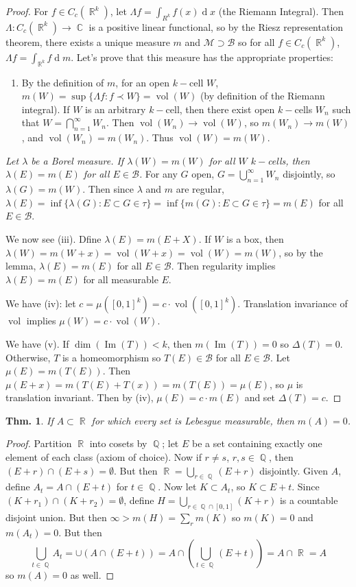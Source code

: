 \documentclass[12pt, a4paper]{book}
\DeclareMathOperator{\Q}{\mathbb{Q}}
\DeclareMathOperator{\R}{\mathbb{R}}
\DeclareMathOperator{\C}{\mathbb{C}}
\DeclareMathOperator{\im}{Im}
\DeclareMathOperator{\vol}{vol}
\renewcommand{\d}[1]{\ensuremath{\operatorname{d}\!{#1}}} %
\newtheorem{theorem}{Thm.}[section]
\theoremstyle{nonumberplain}
\newtheorem{proof}{Proof}
\begin{document}
\begin{proof}
    For $f\in C_c(\R^k)$, let $\Lambda f=\int_{R^k}f(x)\d{x}$ (the Riemann Integral).
    Then $\Lambda:C_c(\R^k)\to\C$ is a positive linear functional, so by the Riesz representation theorem, there exists a unique measure $m$ and $\mathcal{M}\supset\mathcal{B}$ so for all $f\in C_c(\R^k)$, $\Lambda f=\int_{\R^k}f\d{m}$.
    Let's prove that this measure has the appropriate properties:
    \begin{enumerate}[nolistsep]
        \item By the definition of $m$, for an open $k-$cell $W$, $m(W)=\sup\{\Lambda f:f\prec W\}=\vol(W)$ (by definition of the Riemann integral).
            If $W$ is an arbitrary $k-$cell, then there exist open $k-$cells $W_n$ such that $W=\bigcap\limits_{n=1}^\infty W_n$.
            Then $\vol(W_n)\to\vol(W)$, so $m(W_n)\to m(W)$, and $\vol(W_n)=m(W_n)$.
            Thus $\vol(W)=m(W)$.
    \end{enumerate}
    \textit{Let $\lambda$ be a Borel measure.
    If $\lambda(W)=m(W)$ for all $W$ $k-$cells, then $\lambda(E)=m(E)$ for all $E\in\mathcal{B}$.}
    For any $G$ open, $G=\bigcup\limits_{n=1}^\infty W_n$ disjointly, so $\lambda(G)=m(W)$.
    Then since $\lambda$ and $m$ are regular, $\lambda(E)=\inf\{\lambda(G):E\subset G\in\tau\}=\inf\{m(G):E\subset G\in\tau\}=m(E)$ for all $E\in\mathcal{B}$.

    We now see (iii).
    Dfine $\lambda(E)=m(E+X)$.
    If $W$ is a box, then $\lambda(W)=m(W+x)=\vol(W+x)=\vol(W)=m(W)$, so by the lemma, $\lambda(E)=m(E)$ for all $E\in\mathcal{B}$.
    Then regularity implies $\lambda(E)=m(E)$ for all measurable $E$.

    We have (iv): let $c=\mu([0,1]^k)=c\cdot\vol([0,1]^k)$.
    Translation invariance of $\vol$ implies $\mu(W)=c\cdot\vol(W)$.

    We have (v).
    If $\dim(\im(T))<k$, then $m(\im(T))=0$ so $\Delta(T)=0$.
    Otherwise, $T$ is a homeomorphism so $T(E)\in\mathcal{B}$ for all $E\in\mathcal{B}$.
    Let $\mu(E)=m(T(E))$.
    Then $\mu(E+x)=m(T(E)+T(x))=m(T(E))=\mu(E)$, so $\mu$ is translation invariant.
    Then by (iv), $\mu(E)=c\cdot m(E)$ and set $\Delta(T)=c$.
\end{proof}
\begin{theorem}
    If $A\subset\R$ for which every set is Lebesgue measurable, then $m(A)=0$.
\end{theorem}
\begin{proof}
    Partition $\R$ into cosets by $\Q$; let $E$ be a set containing exactly one element of each class (axiom of choice).
    Now if $r\neq s$, $r,s\in\Q$, then $(E+r)\cap (E+s)=\emptyset$.
    But then $\R=\bigcup\limits_{r\in\Q}(E+r)$ disjointly.
    Given $A$, define $A_t=A\cap (E+t)$ for $t\in\Q$.
    Now let $K\subset A_t$, so $K\subset E+t$.
    Since $(K+r_1)\cap (K+r_2)=\emptyset$, define $H=\bigcup\limits_{r\in\Q\cap[0,1]}(K+r)$ is a countable disjoint union.
    But then $\infty>m(H)=\sum_r m(K)$ so $m(K)=0$ and $m(A_t)=0$.
    But then
    \[\bigcup\limits_{t\in\Q}A_t=\cup(A\cap(E+t))=A\cap\left(\bigcup\limits_{t\in\Q}(E+t)\right)=A\cap\R=A\]
    so $m(A)=0$ as well.
\end{proof}
\end{document}
